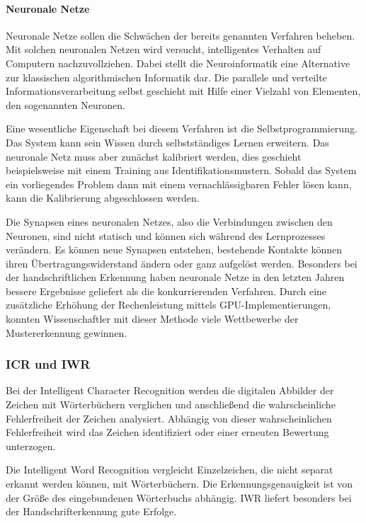 \paragraph{Neuronale Netze}
Neuronale Netze sollen die Schwächen der bereits genannten Verfahren beheben. Mit solchen neuronalen Netzen wird versucht, intelligentes Verhalten auf Computern nachzuvollziehen. Dabei stellt die Neuroinformatik eine Alternative zur klassischen algorithmischen Informatik dar. Die parallele und verteilte Informationsverarbeitung selbst geschieht mit Hilfe einer Vielzahl von Elementen, den sogenannten Neuronen.

Eine wesentliche Eigenschaft bei diesem Verfahren ist die Selbstprogrammierung. Das System kann sein Wissen durch selbstständiges Lernen erweitern. Das neuronale Netz muss aber zunächst kalibriert werden, dies geschieht beispielsweise mit einem Training aus Identifikationsmustern. Sobald das System ein vorliegendes Problem dann mit einem vernachlässigbaren Fehler lösen kann, kann die Kalibrierung abgeschlossen werden. \cite{OCRB}

\newpage

Die Synapsen eines neuronalen Netzes, also die Verbindungen zwischen den Neuronen, sind nicht statisch und können sich während des Lernprozesses verändern. Es können neue Synapsen entstehen, bestehende Kontakte können ihren Übertragungswiderstand ändern oder ganz aufgelöst werden. Besonders bei der handschriftlichen Erkennung haben neuronale Netze in den letzten Jahren bessere Ergebnisse geliefert als die konkurrierenden Verfahren. Durch eine zusätzliche Erhöhung der Rechenleistung mittels GPU-Implementierungen, konnten Wissenschaftler mit dieser Methode viele Wettbewerbe der Mustererkennung gewinnen. \cite{OCRB}

\subsubsection{ICR und IWR}
Bei der Intelligent Character Recognition werden die digitalen Abbilder der Zeichen mit Wörterbüchern verglichen und anschließend  die wahrscheinliche Fehlerfreiheit der Zeichen analysiert. Abhängig von dieser wahrscheinlichen Fehlerfreiheit wird das Zeichen identifiziert oder einer erneuten Bewertung unterzogen.

Die Intelligent Word Recognition vergleicht Einzelzeichen, die nicht separat erkannt werden können, mit Wörterbüchern. Die Erkennungsgenauigkeit ist von der Größe des eingebundenen Wörterbuchs abhängig. IWR liefert besonders bei der Handschrifterkennung gute Erfolge. \cite{OCRB}

